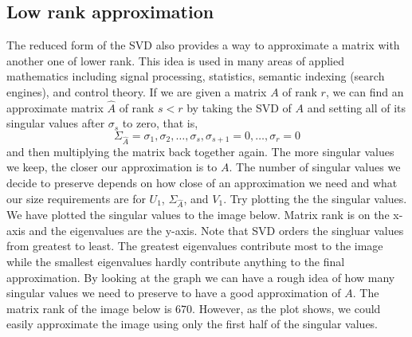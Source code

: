 \subsection*{Low rank approximation}
The reduced form of the SVD also provides a way to approximate a
matrix with another one of lower rank. This idea is used in many areas of applied
mathematics including signal processing, statistics, semantic
indexing (search engines), and control theory.  If we are given a matrix $A$ of rank $r$,
we can find an approximate matrix $\widehat A$ of rank $s<r$ by taking
the SVD of $A$ and setting all of its singular values after
$\sigma_s$ to zero, that is,
\begin{equation*}
\Sigma_{\widehat A} = \sigma_1, \sigma_2, \ldots, \sigma_s,\sigma_{s+1}=0,\ldots,\sigma_r=0
\end{equation*}
and then multiplying the matrix back together again.  The more singular values we keep, the closer our approximation is to $A$.
  The number of singular values we decide to preserve depends on how close of an approximation we need and what our size requirements are for $U_1$, $\Sigma_{\widehat A}$, and $V_1$.
Try plotting the the singular values.  We have plotted the singular values to the image below.  Matrix rank is on the x-axis and the eigenvalues are the y-axis.  Note that SVD orders the singluar values from greatest to least.  The greatest eigenvalues contribute most to the image while the smallest eigenvalues hardly contribute anything to the final approximation.  By looking at the graph we can have a rough idea of how many singular values we need to preserve to have a good approximation of $A$.  The matrix rank of the image below is $670$.  However, as the plot shows, we could easily approximate the image using only the first half of the singular values.

